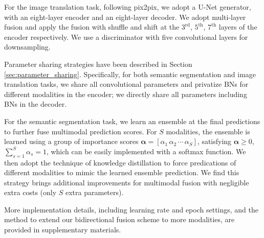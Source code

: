 \documentclass[sigconf]{acmart}
\begin{document}


For the image translation task, following pix2pix, we adopt a U-Net \cite{DBLP:conf/miccai/RonnebergerFB15} generator, with an eight-layer encoder and an eight-layer decoder. We adopt multi-layer fusion and apply the fusion with shuffle and shift at the $3^{\text{rd}}$, $5^{\text{th}}$, $7^{\text{th}}$ layers of the encoder respectively. We use a discriminator with five convolutional layers for downsampling. 

Parameter sharing strategies have been described in Section \ref{sec:parameter_sharing}. Specifically, for both semantic segmentation and image translation tasks, we share all convolutional parameters and privatize BNs for different modalities in the encoder; we directly share all parameters including BNs in the decoder.

For the semantic segmentation task, we learn an ensemble at the final predictions to further fuse multimodal prediction scores. For $S$ modalities, the ensemble is learned using a group of importance scores $\bm{\alpha}\!=[\alpha_1\,\alpha_2\,\cdots\,\alpha_S]$, satisfying $\bm{\alpha}\!\ge\!0$, $\sum_{s=1}^S\alpha_s\!=\!1$, which can be easily implemented with a softmax function. We then adopt the technique of knowledge distillation to force predications of different modalities to mimic the learned ensemble prediction. We find this strategy brings additional improvements for multimodal fusion with negligible extra costs (only $S$ extra parameters).

More implementation details, including learning rate and epoch settings, and the method to extend our bidirectional fusion scheme to more modalities, are provided in supplementary materials.
\end{document}

